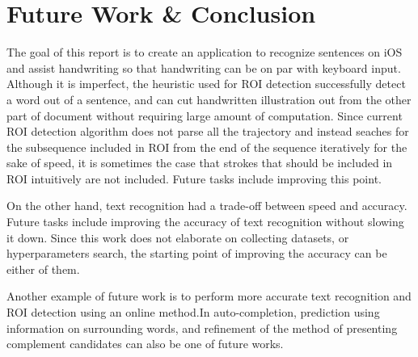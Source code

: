 \section{Future Work \& Conclusion}
\label{section:conclusion}

The goal of this report is to create an application to recognize sentences on iOS
and assist handwriting so that handwriting can be on par with keyboard input.
Although it is imperfect, the heuristic used for ROI detection successfully
detect a word out of a sentence, and can cut handwritten illustration out from the other
part of document without requiring large amount of computation. Since current ROI detection
algorithm does not parse all the trajectory and instead seaches for the subsequence included
in ROI from the end of the sequence iteratively for the sake of speed, it is sometimes the case
that strokes that should be included in ROI intuitively are not included.
Future tasks include improving this point.

On the other hand, text recognition had a trade-off between speed and accuracy.
Future tasks include improving the accuracy of text recognition without slowing it down.
Since this work does not elaborate on collecting datasets, or hyperparameters search,
the starting point of improving the accuracy can be either of them.

Another example of future work is to perform more accurate text recognition and ROI detection
using an online method.In auto-completion, prediction using information on surrounding words,
and refinement of the method of presenting complement candidates can also be one of future works.
